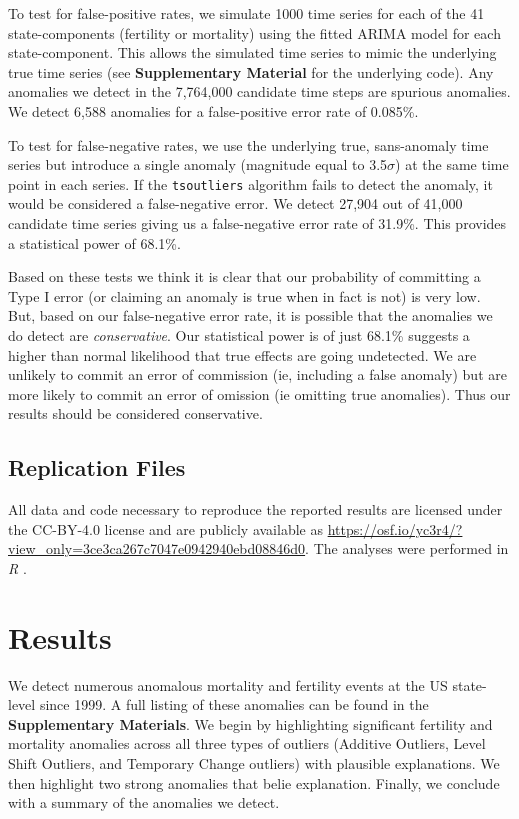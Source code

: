 \documentclass[12pt]{article}
\begin{document}
To test for false-positive rates, we simulate 1000 time series for each
of the 41 state-components (fertility or mortality) using the fitted
ARIMA model for each state-component. This allows the simulated time
series to mimic the underlying true time series (see
\textbf{Supplementary Material} for the underlying code). Any anomalies
we detect in the 7,764,000 candidate time steps are spurious anomalies.
We detect 6,588 anomalies for a false-positive error rate of 0.085\%.

To test for false-negative rates, we use the underlying true,
sans-anomaly time series but introduce a single anomaly (magnitude equal
to 3.5\(\sigma\)) at the same time point in each series. If the
\texttt{tsoutliers} algorithm fails to detect the anomaly, it would be
considered a false-negative error. We detect 27,904 out of 41,000
candidate time series giving us a false-negative error rate of 31.9\%.
This provides a statistical power of 68.1\%.

Based on these tests we think it is clear that our probability of
committing a Type I error (or claiming an anomaly is true when in fact
is not) is very low. But, based on our false-negative error rate, it is
possible that the anomalies we do detect are \emph{conservative}. Our
statistical power is of just 68.1\% suggests a higher than normal
likelihood that true effects are going undetected. We are unlikely to
commit an error of commission (ie, including a false anomaly) but are
more likely to commit an error of omission (ie omitting true anomalies).
Thus our results should be considered conservative.

\hypertarget{replication-files}{%
\subsection{Replication Files}\label{replication-files}}

All data and code necessary to reproduce the reported results are
licensed under the CC-BY-4.0 license and are publicly available as
\url{https://osf.io/yc3r4/?view_only=3ce3ca267c7047e0942940ebd08846d0}.
The analyses were performed in \emph{R} \citep{rcore}.

\hypertarget{results}{%
\section{Results}\label{results}}

We detect numerous anomalous mortality and fertility events at the US
state-level since 1999. A full listing of these anomalies can be found
in the \textbf{Supplementary Materials}. We begin by highlighting
significant fertility and mortality anomalies across all three types of
outliers (Additive Outliers, Level Shift Outliers, and Temporary Change
outliers) with plausible explanations. We then highlight two strong
anomalies that belie explanation. Finally, we conclude with a summary of
the anomalies we detect.
\end{document}
